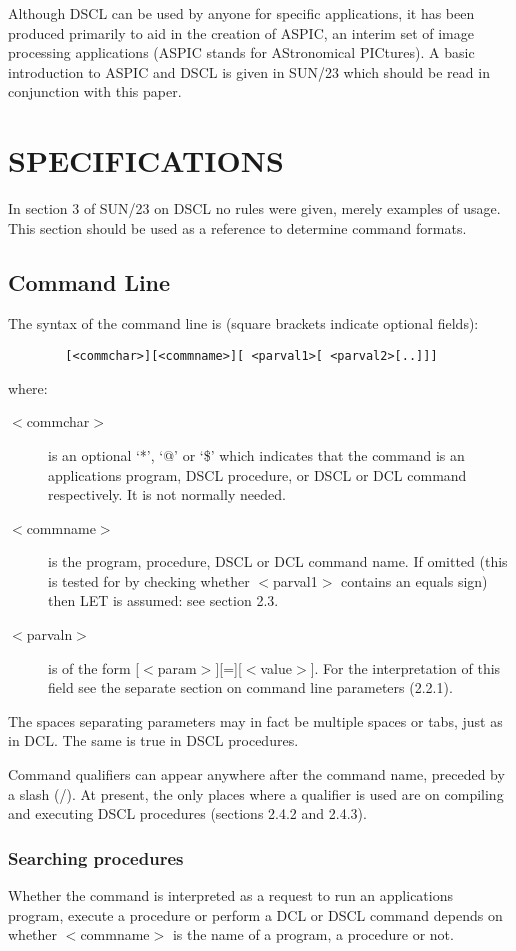 Although DSCL can be used by anyone for specific applications, it has been
produced primarily to aid in the creation of ASPIC, an interim set of image
processing applications (ASPIC stands for AStronomical PICtures).
A basic introduction to ASPIC and DSCL is given in SUN/23 which should be
read in conjunction with this paper.
\section {SPECIFICATIONS}
In section 3 of SUN/23 on DSCL no rules were given, merely examples of usage.
This section should be used as a reference to determine command formats.
\subsection {Command Line}
The syntax of the command line is (square brackets indicate optional fields):
\begin{verbatim}
        [<commchar>][<commname>][ <parval1>[ <parval2>[..]]]
\end{verbatim}
where:
\begin{description}
\begin{description}
\item [$<$commchar$>$] is an optional `*', `@' or `\$' which indicates that the
command is an applications program, DSCL procedure, or DSCL or DCL command
respectively.
It is not normally needed.
\item [$<$commname$>$] is the program, procedure, DSCL or DCL command name.
If omitted (this is tested for by checking whether $<$parval1$>$ contains an equals
sign) then LET is assumed: see section 2.3.
\item [$<$parvaln$>$] is of the form [$<$param$>$][=][$<$value$>$].
For the interpretation of this field see the separate section on command line
parameters (2.2.1).
\end{description}
\end{description}
The spaces separating parameters may in fact be multiple spaces or tabs, just as
in DCL.
The same is true in DSCL procedures.

Command qualifiers can appear anywhere after the command name, preceded by a
slash (/).
At present, the only places where a qualifier is used are on compiling and
executing DSCL procedures (sections 2.4.2 and 2.4.3).
\subsubsection {Searching procedures}
Whether the command is interpreted as a request to run an applications program,
execute a procedure or perform a DCL or DSCL command depends on whether
$<$commname$>$ is the name of a program, a procedure or not.


